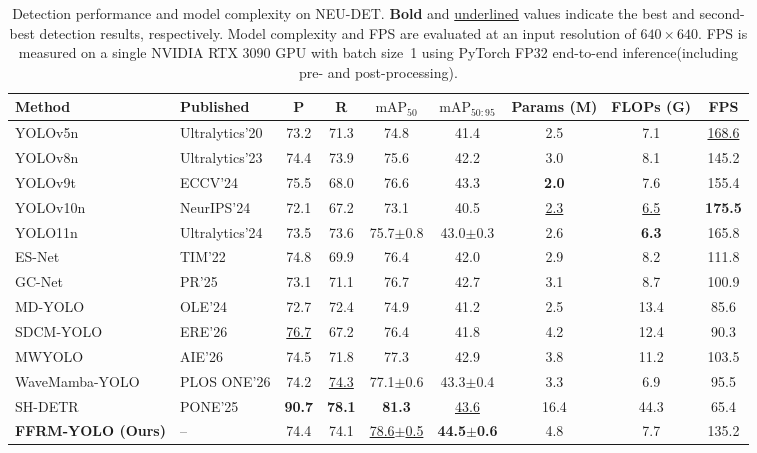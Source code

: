 \documentclass[pdflatex,sn-nature]{sn-jnl}
\begin{document}
\begin{table}[!t]
\caption{Detection performance and model complexity on NEU-DET. \textbf{Bold} and \underline{underlined} values indicate the best and second-best detection results, respectively. Model complexity and FPS are evaluated at an input resolution of $640\times640$. FPS is measured on a single NVIDIA RTX 3090 GPU with batch size~1 using PyTorch FP32 end-to-end inference(including pre- and post-processing).}
\label{tab:comparison_neu}
\centering
\footnotesize
\setlength{\tabcolsep}{1.3pt}
\renewcommand{\arraystretch}{1.12}
\begin{tabular*}{\textwidth}{@{\extracolsep{\fill}}llccccccc@{}}
\toprule
Method & Published & P & R & $\mathrm{mAP}_{50}$ & $\mathrm{mAP}_{50:95}$ & Params (M) & FLOPs (G) & FPS \\
\midrule
YOLOv5n~\cite{Jocher2020YOLOv5} & Ultralytics'20 & 73.2 & 71.3 & 74.8 & 41.4 & 2.5 & 7.1 &\underline{168.6}\\
YOLOv8n~\cite{Jocher2023YOLOv8} & Ultralytics'23 & 74.4 & 73.9 & 75.6 & 42.2 & 3.0 & 8.1 &145.2\\
YOLOv9t~\cite{Wang2024YOLOv9} & ECCV'24 & 75.5 & 68.0 & 76.6 & 43.3 & \textbf{2.0} & 7.6 &155.4\\
YOLOv10n~\cite{Wang2024YOLOv10} & NeurIPS'24 & 72.1 & 67.2 & 73.1 & 40.5 & \underline{2.3} & \underline{6.5} &\textbf{175.5}\\
YOLO11n~\cite{Jocher2024YOLO11} & Ultralytics'24 & 73.5 & 73.6 & 75.7\(\pm\)0.8 & 43.0\(\pm\)0.3 & 2.6 & \textbf{6.3} &165.8\\
ES-Net~\cite{Yu2022ESNet} & TIM'22 & 74.8 & 69.9 & 76.4 & 42.0 & 2.9 & 8.2 &111.8\\
GC-Net~\cite{Liu2025GCNet} & PR'25 & 73.1 & 71.1 & 76.7 & 42.7 & 3.1 & 8.7 &100.9\\
MD-YOLO~\cite{Zheng2024MDYOLO} & OLE'24 & 72.7 & 72.4 & 74.9 & 41.2 & 2.5 & 13.4 &85.6\\
SDCM-YOLO~\cite{Deng2026SDCMYOLO} & ERE'26 & \underline{76.7} & 67.2 & 76.4 & 41.8 & 4.2 & 12.4 &90.3 \\
MWYOLO~\cite{Chen2026MWYOLO} & AIE'26 & 74.5 & 71.8 & 77.3 & 42.9 & 3.8 & 11.2 &103.5\\
WaveMamba-YOLO~\cite{Ge2026WaveMambaYOLO} & PLOS ONE'26 & 74.2 &\underline{74.3} & 77.1\(\pm\)0.6 & 43.3\(\pm\)0.4 & 3.3 & 6.9 & 95.5 \\
SH-DETR~\cite{Wu2025SHDETR} & PONE'25 & \textbf{90.7} & \textbf{78.1} & \textbf{81.3} & \underline{43.6} & 16.4 & 44.3 &65.4\\
\midrule
\textbf{FFRM-YOLO (Ours)} & -- & 74.4 & 74.1 & \underline{78.6\(\pm\)0.5} & \textbf{44.5\(\pm\)0.6} & 4.8 & 7.7 &135.2\\
\bottomrule
\end{tabular*}
\end{table}
\end{document}
